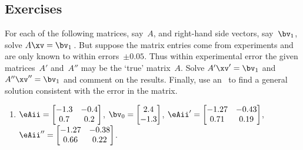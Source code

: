 \subsection{Exercises}



\begin{exercise} \label{ex:errmats} 
For each of the following matrices, say~\(A\), and right-hand side vectors, say~\(\bv_1\),
solve \(A\xv=\bv_1\)\,.
But suppose the matrix entries come from experiments and are only known to within errors~\(\pm0.05\).
Thus within experimental error the given matrices~\(A'\) and~\(A''\) may be the `true' matrix~\(A\).
Solve \(A'\xv'=\bv_1\) and \(A''\xv''=\bv_1\) and comment on the results.
Finally, use an \svd\ to find a general solution consistent with the error in the matrix.

\begin{enumerate} \raggedright
\item \(\eAii=\begin{bmatrix} -1.3&-0.4\\0.7&0.2 \end{bmatrix}\),
\(\bv_{\arabic{enumii}}=\begin{bmatrix} 2.4\\-1.3 \end{bmatrix}\), 
\(\eAii'=\begin{bmatrix} -1.27&-0.43\\0.71&0.19 \end{bmatrix}\),
\(\eAii''=\begin{bmatrix} -1.27&-0.38\\0.66&0.22 \end{bmatrix}\).


\end{enumerate}
\end{exercise}
